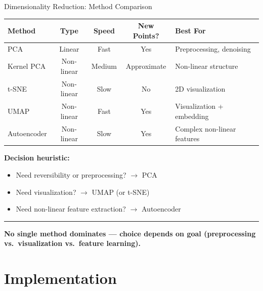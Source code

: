 \documentclass[8pt,aspectratio=169]{beamer}
\newcommand{\bottomnote}[1]{%
\vfill
\vspace{-2mm}
\textcolor{mllavender2}{\rule{\textwidth}{0.4pt}}
\vspace{1mm}
\footnotesize
\textbf{#1}
}
\begin{document}
\begin{frame}[t]{Dimensionality Reduction: Method Comparison}
\begin{center}
\small
\begin{tabular}{lcccl}
\toprule
\textbf{Method} & \textbf{Type} & \textbf{Speed} & \textbf{New Points?} & \textbf{Best For} \\
\midrule
PCA & Linear & Fast & Yes & Preprocessing, denoising \\
Kernel PCA & Non-linear & Medium & Approximate & Non-linear structure \\
t-SNE & Non-linear & Slow & No & 2D visualization \\
UMAP & Non-linear & Fast & Yes & Visualization + embedding \\
Autoencoder & Non-linear & Slow & Yes & Complex non-linear features \\
\bottomrule
\end{tabular}
\end{center}

\vspace{0.3em}
\textbf{Decision heuristic:}
\begin{itemize}
  \item Need reversibility or preprocessing? $\rightarrow$ PCA
  \item Need visualization? $\rightarrow$ UMAP (or t-SNE)
  \item Need non-linear feature extraction? $\rightarrow$ Autoencoder
\end{itemize}
\bottomnote{No single method dominates --- choice depends on goal (preprocessing vs.\ visualization vs.\ feature learning).}
\end{frame}

\section{Implementation}
\end{document}
